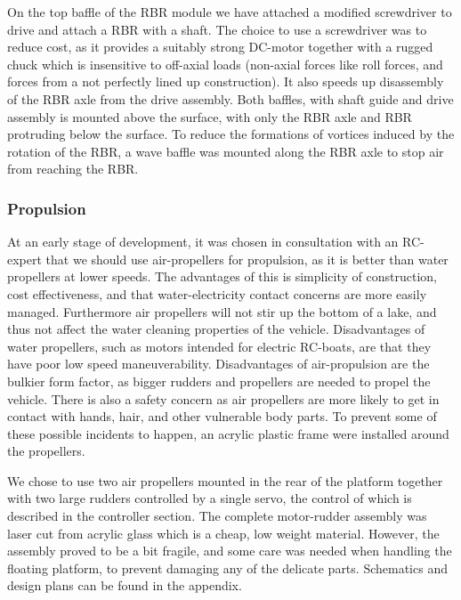 On the top baffle of the RBR module we have attached a modified screwdriver to drive and attach a RBR with a shaft. The choice to use a screwdriver was to reduce cost, as it provides a suitably strong DC-motor together with a rugged chuck which is insensitive to off-axial loads (non-axial forces like roll forces, and forces from a not perfectly lined up construction). It also speeds up disassembly of the RBR axle from the drive assembly. Both baffles, with shaft guide and drive assembly is mounted above the surface, with only the RBR axle and RBR protruding below the surface. To reduce the formations of vortices induced by the rotation of the RBR, a wave baffle was mounted along the RBR axle to stop air from reaching the RBR.

\subsubsection{Propulsion}
At an early stage of development, it was chosen in consultation with an RC-expert that we should use air-propellers for propulsion, as it is better than water propellers at lower speeds. The advantages of this is simplicity of construction, cost effectiveness, and that water-electricity contact concerns are more easily managed. Furthermore air propellers will not stir up the bottom of a lake, and thus not affect the water cleaning properties of the vehicle.
Disadvantages of water propellers, such as motors intended for electric RC-boats, are that they have poor low speed maneuverability. Disadvantages of air-propulsion are the bulkier form factor, as bigger rudders and propellers are needed to propel the vehicle. There is also a safety concern as air propellers are more likely to get in contact with hands, hair, and other vulnerable body parts. To prevent some of these possible incidents to happen, an acrylic plastic frame were installed around the propellers.

We chose to use two air propellers mounted in the rear of the platform together with two large rudders controlled by a single servo, the control of which is described in the controller section. The complete motor-rudder assembly was laser cut from acrylic glass which is a cheap, low weight material. However, the assembly proved to be a bit fragile, and some care was needed when handling the floating platform, to prevent damaging any of the delicate parts. Schematics and design plans can be found in the appendix.
